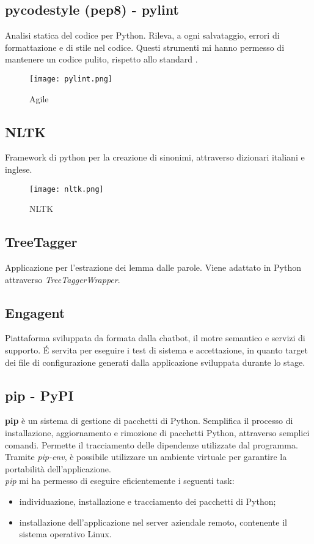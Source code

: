 \subsection*{pycodestyle (pep8) - pylint}
Analisi statica del codice per Python. Rileva, a ogni salvataggio, errori di formattazione e di stile nel codice. Questi strumenti mi hanno permesso di mantenere un codice pulito, rispetto allo standard . 
\begin{figure}[H]
    \centering
    \texttt{[image: pylint.png]} 
    \caption{Agile}
    \label{logo:company}
\end{figure}

\subsection*{NLTK}
Framework di python per la creazione di sinonimi, attraverso dizionari italiani e inglese.
\begin{figure}[H]
    \centering
    \texttt{[image: nltk.png]} 
    \caption{NLTK}
    \label{logo:company}
\end{figure}

\subsection*{TreeTagger}
Applicazione per l'estrazione dei lemma dalle parole. Viene adattato in Python attraverso \textit{TreeTaggerWrapper}.

\subsection*{Engagent}
Piattaforma sviluppata da {\company} formata dalla chatbot, il motre semantico e servizi di supporto. \'E servita per eseguire i test di sistema e accettazione, in quanto target dei file di configurazione generati dalla applicazione sviluppata durante lo stage.

\subsection{pip - PyPI}
\textbf{pip} è un sistema di gestione di pacchetti di Python. Semplifica il processo di installazione, aggiornamento e rimozione di pacchetti Python, attraverso semplici comandi. Permette il tracciamento delle dipendenze utilizzate dal programma. Tramite \textit{pip-env}, è possibile utilizzare un ambiente virtuale per garantire la portabilità dell'applicazione.\\
\textit{pip} mi ha permesso di eseguire eficientemente i seguenti task:
\begin{itemize}
    \item individuazione, installazione e tracciamento dei pacchetti di Python;
    \item installazione dell'applicazione nel server aziendale remoto, contenente il sistema operativo Linux.
\end{itemize}

